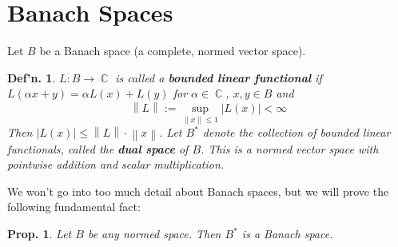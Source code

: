 \documentclass[12pt, a4paper]{book}
\DeclareMathOperator{\C}{\mathbb{C}}
\newcommand{\norm}[1]{\left\lVert#1\right\rVert} %
\newtheorem{definition}[theorem]{Def'n.}
\newtheorem{proposition}[theorem]{Prop.}
\theoremstyle{nonumberplain}
\begin{document}
\section{Banach Spaces}
Let $B$ be a Banach space (a complete, normed vector space).
\begin{definition}
    $L:B\to\C$ is called a \textbf{bounded linear functional} if $L(\alpha x+y)=\alpha L(x)+L(y)$ for $\alpha\in\C$, $x,y\in B$ and
    \[\norm{L}:=\sup_{\norm{x}\leq 1}|L(x)|<\infty\]
    Then $|L(x)|\leq\norm{L}\cdot\norm{x}$.
    Let $B^*$ denote the collection of bounded linear functionals, called the \textbf{dual space} of $B$.
    This is a normed vector space with pointwise addition and scalar multiplication.
\end{definition}
We won't go into too much detail about Banach spaces, but we will prove the following fundamental fact:
\begin{proposition}
    Let $B$ be any normed space.
    Then $B^*$ is a Banach space.
\end{proposition}
\end{document}
